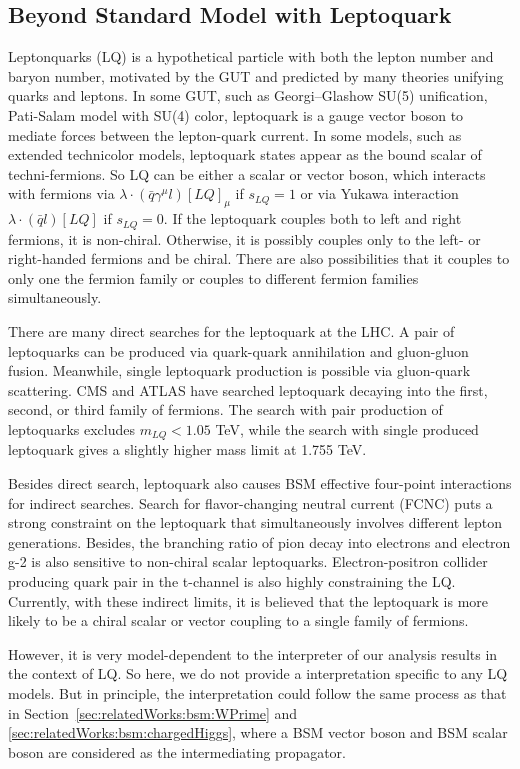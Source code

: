 \FloatBarrier

\subsection{Beyond Standard Model with Leptoquark}
\label{sec:relatedWorks:bsm:leptoquark}


Leptonquarks (LQ) is a hypothetical particle with both the lepton number and baryon number, motivated by the GUT and predicted by many theories unifying quarks and leptons. In some GUT, such as Georgi–Glashow SU(5) unification, Pati-Salam model with SU(4) color, leptoquark is a gauge vector boson to mediate forces between the lepton-quark current. In some models, such as extended technicolor models, leptoquark states appear as the bound scalar of techni-fermions. So LQ can be either a scalar or vector boson, which interacts with fermions via $\lambda \cdot (\bar{q} \gamma^\mu l) [LQ]_\mu$ if $s_{LQ}=1$ or via Yukawa interaction $\lambda \cdot (\bar{q}l) [LQ] $ if $s_{LQ}=0$. If the leptoquark couples both to left and right fermions, it is non-chiral. Otherwise, it is possibly couples only to the left- or right-handed fermions and be chiral. There are also possibilities that it couples to only one the fermion family or couples to different fermion families simultaneously. 

There are many direct searches for the leptoquark at the LHC. A pair of leptoquarks can be produced via quark-quark annihilation and gluon-gluon fusion. Meanwhile, single leptoquark production is possible via gluon-quark scattering. CMS and ATLAS have searched leptoquark decaying into the first, second, or third family of fermions. The search with pair production of leptoquarks excludes $m_{LQ}<1.05$ TeV, while the search with single produced leptoquark gives a slightly higher mass limit at 1.755 TeV. 

Besides direct search, leptoquark also causes BSM effective four-point interactions for indirect searches. Search for flavor-changing neutral current (FCNC) puts a strong constraint on the leptoquark that simultaneously involves different lepton generations. Besides, the branching ratio of pion decay into electrons and electron g-2 is also sensitive to non-chiral scalar leptoquarks. Electron-positron collider producing quark pair in the t-channel is also highly constraining the LQ.  Currently, with these indirect limits, it is believed that the leptoquark is more likely to be a chiral scalar or vector coupling to a single family of fermions.

However, it is very model-dependent to the interpreter of our analysis results in the context of LQ. So here, we do not provide a interpretation specific to any LQ models. But in principle, the interpretation could follow the same process as that in Section~\ref{sec:relatedWorks:bsm:WPrime} and \ref{sec:relatedWorks:bsm:chargedHiggs}, where a BSM vector boson and BSM scalar boson are considered as the intermediating propagator.



